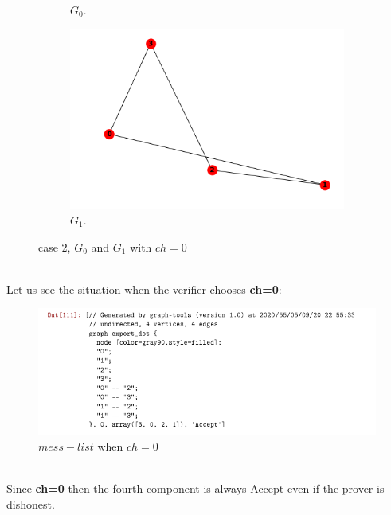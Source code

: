 \documentclass[12pt,a4paper]{article}
\begin{document}
\begin{itemize}
\begin{figure}[h!]
\begin{subfigure}[b]{.35\linewidth}
		\caption{$G_0$.}
	\end{subfigure}
	\begin{subfigure}[b]{.35\linewidth}
		\includegraphics[width=\linewidth]{3-13.png}
		\caption{$G_1$.}
	\end{subfigure}
	\caption{case 2, $G_0$ and $G_1$ with $ch=0$}
	\label{20}
\end{figure}\\
Let us see the situation when the verifier chooses \textbf{ch=0}:\\
\begin{figure}[h]
	\centering
	\includegraphics[width=1.25\linewidth]{3-12}
	\caption{$mess-list$ when $ch=0$}
	\label{fig:3-12}
\end{figure}\\
Since \textbf{ch=0} then the fourth component is always Accept even if the prover is dishonest.\\


\end{itemize}
\end{document}
